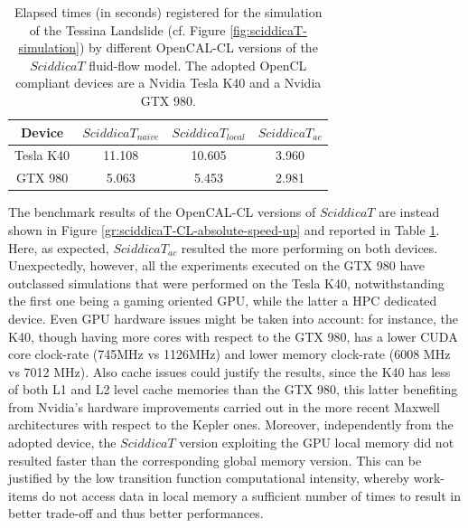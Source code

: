 \begin{table}
	\centering
	\begin{tabular}{cccc}
		\hline Device & $SciddicaT_{naive}$ & $SciddicaT_{local}$ &
		$SciddicaT_{ac}$ \\ \hline Tesla K40 & 11.108 & 10.605 &
		3.960\\ GTX 980 & 5.063 & 5.453 & 2.981\\ \hline
	\end{tabular}
	\caption{Elapsed times (in seconds) registered for the simulation of the
		Tessina Landslide (cf. Figure \ref{fig:sciddicaT-simulation}) by
		different OpenCAL-CL versions of the $SciddicaT$ fluid-flow model. The
		adopted OpenCL compliant devices are a Nvidia Tesla K40 and a Nvidia
		GTX 980.}
	\label{tab:sciddicaT-CL-execution-times}
\end{table}

The benchmark results of the OpenCAL-CL versions of $SciddicaT$
are instead shown in Figure
\ref{gr:sciddicaT-CL-absolute-speed-up} and reported in Table \ref{tab:sciddicaT-CL-execution-times}. Here, as expected,
$SciddicaT_{ac}$ resulted the more performing on both
devices. Unexpectedly, however, all the experiments executed on
the GTX 980 have outclassed simulations that were performed on the
Tesla K40, notwithstanding the first one being a gaming oriented
GPU, while the latter a HPC dedicated device. Even GPU hardware
issues might be taken into account: for instance, the K40, though
having more cores with respect to the GTX 980, has a lower CUDA
core clock-rate (745MHz vs 1126MHz) and lower memory clock-rate
(6008 MHz vs 7012 MHz). Also cache issues could justify the
results, since the K40 has less of both L1 and L2 level cache
memories than the GTX 980, this latter benefiting from Nvidia's
hardware improvements carried out in the more recent Maxwell
architectures with respect to the Kepler ones. Moreover,
independently from the adopted device, the $SciddicaT$ version
exploiting the GPU local memory did not resulted faster than the
corresponding global memory version. This can be justified by the
low transition function computational intensity, whereby
work-items do not access data in local memory a sufficient number
of times to result in better trade-off and thus better
performances.

